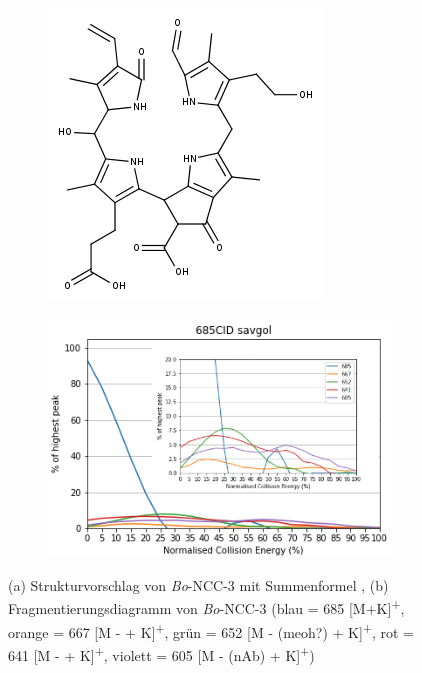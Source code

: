 \begin{figure}[!htbp]
  \begin{subfigure}[b]{0.4\textwidth}
    \includegraphics[width=\textwidth]{figures/Kapitel4/Kataboliten/fragmentation_structures/VWA_Katabolit_685.png}
    \caption{}
    \label{fig:685MKLeafspraystructure}
  \end{subfigure}
  \hfill
  \begin{subfigure}[b]{0.7\textwidth}
    \includegraphics[width=\textwidth]{figures/Kapitel4/Kataboliten/diags/685CID-savgol.png}
    \caption{}
    \label{fig:685MKLeafspraydiags}
  \end{subfigure}
  \caption[Strukturvorschlag von \textit{Bo}-NCC-3 und Fragmentierungsdiagramm, Quelle: Autor]{(a) Strukturvorschlag von \textit{Bo}-NCC-3 mit Summenformel , (b) Fragmentierungsdiagramm von \textit{Bo}-NCC-3 (blau = 685 [M+K]\textsuperscript{+}, orange = 667 [M -  + K]\textsuperscript{+}, grün = 652 [M - (\gls{meoh}?) + K]\textsuperscript{+}, rot = 641 [M -  + K]\textsuperscript{+}, violett = 605 [M - (\gls{nAb}) + K]\textsuperscript{+})}
\end{figure}

